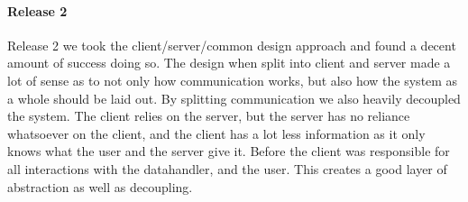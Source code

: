 \documentclass[12pt]{report}
\begin{document}
    \paragraph{Release 2}

    \indent
    Release 2 we took the client/server/common design approach and found a decent amount of success doing so.
    The design when split into client and server made a lot of sense as to not only how communication works, but also how the system as a whole should be laid out.
    By splitting communication we also heavily decoupled the system.
    The client relies on the server, but the server has no reliance whatsoever on the client, and the client has a lot less information as it only knows what the user and the server give it.
    Before the client was responsible for all interactions with the datahandler, and the user.
    This creates a good layer of abstraction as well as decoupling.

    \begin{center}
    \end{center}

    \newpage
\end{document}
